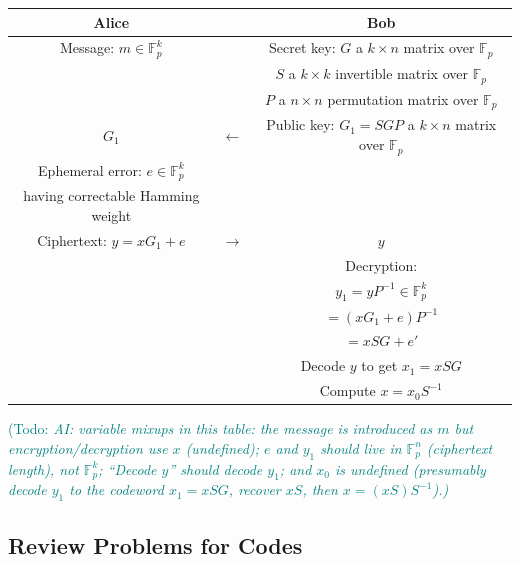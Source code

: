 \documentclass{article}
\theoremstyle{plain}
\theoremstyle{definition}
\theoremstyle{remark}
\numberwithin{theorem}{section}
\newcommand{\todo}[1]{\textcolor{teal}{{\sf (Todo:} {\sl{#1})}}}
\newcommand{\todo}[1]{}
\newcommand{\FF}{\mathbb{F}}
\begin{document}
     \begin{tabular}{ccc}
       Alice & & Bob \\
       \hline
       Message: $m \in \FF_p^k$ & &  Secret key: $G$ a $k \times n$ matrix over $\FF_p$ \\
       & & $S$ a $k \times k$ invertible matrix over $\FF_p$ \\
       & & $P$ a $n \times n$ permutation matrix over $\FF_p$ \\
       $G_1$ & $\longleftarrow$ & Public key: $G_1 = SGP$ a $k \times n$ matrix over $\FF_p$ \\
       Ephemeral error: $e \in \FF_p^k$ \\
       having correctable Hamming weight & &  \\
       Ciphertext: $y = xG_1 + e$ & $\longrightarrow$ & $y$ \\
					      & & Decryption: \\
                          && $y_1 = yP^{-1} \in \FF_p^k$ \\
                          & & $= (xG_1+e)P^{-1}$ \\
                          & & $= xSG+e'$ \\
                          & & Decode $y$ to get $x_1 = xSG$ \\
                          & & Compute $x = x_0 S^{-1}$
      \end{tabular}
      \todo{AI: variable mixups in this table: the message is introduced as $m$ but encryption/decryption use $x$ (undefined); $e$ and $y_1$ should live in $\FF_p^n$ (ciphertext length), not $\FF_p^k$; ``Decode $y$'' should decode $y_1$; and $x_0$ is undefined (presumably decode $y_1$ to the codeword $x_1 = xSG$, recover $xS$, then $x = (xS)S^{-1}$).}
      \vspace{3em}

\subsection{Review Problems for Codes}
\end{document}
